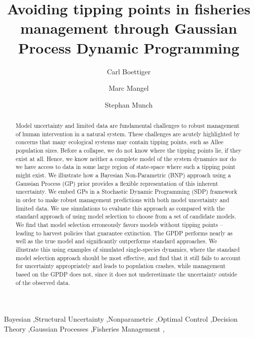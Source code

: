 \documentclass[author-year, 12pt,review]{components/elsarticle} %
\begin{document}
\begin{frontmatter}

  \title{Avoiding tipping points in fisheries management through Gaussian Process
Dynamic Programming}
    \author[cstar]{Carl Boettiger}
    \author[cstar]{Marc Mangel}
  
  
    \author[noaa]{Stephan Munch}
  
  
      \address[cstar]{Center for Stock Assessment Research, Department of Applied Math and
Statistics, University of California, Mail Stop SOE-2, Santa Cruz, CA
95064, USA}    
    \address[marc]{Center for Stock Assessment Research, Department of Applied Math and
Statistics, University of California, Mail Stop SOE-2, Santa Cruz, CA
95064, USA and Department of Biology, University of Bergen, Bergen,
Norway 9020}    
    \address[noaa]{Southwest Fisheries Science Center, National Oceanic and Atmospheric
Administration, 110 Shaffer Road, Santa Cruz, CA 95060, USA}    
  
  \begin{abstract}
  Model uncertainty and limited data are fundamental challenges to robust
  management of human intervention in a natural system. These challenges
  are acutely highlighted by concerns that many ecological systems may
  contain tipping points, such as Allee population sizes. Before a
  collapse, we do not know where the tipping points lie, if they exist at
  all. Hence, we know neither a complete model of the system dynamics nor
  do we have access to data in some large region of state-space where such
  a tipping point might exist. We illustrate how a Bayesian Non-Parametric
  (BNP) approach using a Gaussian Process (GP) prior provides a flexible
  representation of this inherent uncertainty. We embed GPs in a
  Stochastic Dynamic Programming (SDP) framework in order to make robust
  management predictions with both model uncertainty and limited data. We
  use simulations to evaluate this approach as compared with the standard
  approach of using model selection to choose from a set of candidate
  models. We find that model selection erroneously favors models without
  tipping points -- leading to harvest policies that guarantee extinction.
  The GPDP performs nearly as well as the true model and significantly
  outperforms standard approaches. We illustrate this using examples of
  simulated single-species dynamics, where the standard model selection
  approach should be most effective, and find that it still fails to
  account for uncertainty appropriately and leads to population crashes,
  while management based on the GPDP does not, since it does not
  underestimate the uncertainty outside of the observed data.
  \end{abstract}
   \begin{keyword} Bayesian \sep Structural Uncertainty \sep Nonparametric \sep Optimal Control \sep Decision Theory \sep Gaussian Processes \sep Fisheries Management \sep \end{keyword}
 \end{frontmatter}
\end{document}
